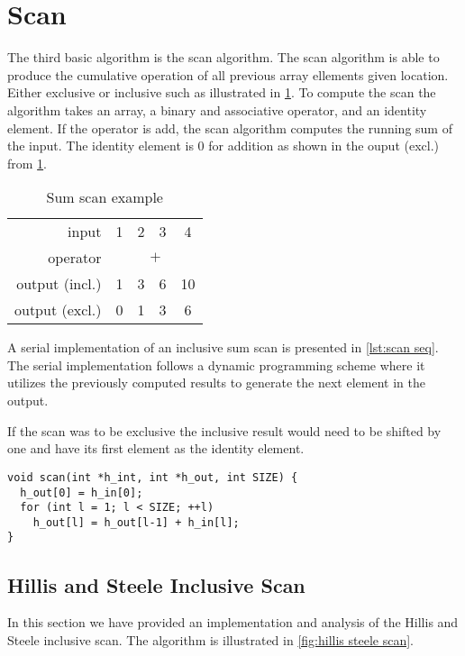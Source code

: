 \section{Scan}
\label{sec:scan}

The third basic algorithm is the scan algorithm.
The scan algorithm is able to produce the cumulative operation of all previous array ellements given location.
Either exclusive or inclusive such as illustrated in \cref{tab:scan example}.
To compute the scan the algorithm takes an array, a binary and associative operator, and an identity element.
If the operator is add, the scan algorithm computes the running sum of the input.
The identity element is 0 for addition as shown in the ouput (excl.) from \cref{tab:scan example}.

\begin{table}[htb]
  \centering
  \begin{tabular}{r | c c c c}
    \toprule
    input & 1 & 2 & 3 & 4 \\
    operator & \multicolumn{4}{c}{$\mathtt{+}$} \\
    output (incl.) & 1 & 3 & 6 & 10 \\
    output (excl.) & 0 & 1 & 3 & 6 \\
    \bottomrule
  \end{tabular}
  \caption{Sum scan example}
  \label{tab:scan example}
\end{table}
    
A serial implementation of an inclusive sum scan is presented in \cref{lst:scan seq}.
The serial implementation follows a dynamic programming scheme where it utilizes the previously computed results to generate the next element in the output.

If the scan was to be exclusive the inclusive result would need to be shifted by one and have its first element as the identity element.
\begin{lstlisting}[caption={Serial scan}, label={lst:scan seq}]
void scan(int *h_int, int *h_out, int SIZE) {
  h_out[0] = h_in[0];
  for (int l = 1; l < SIZE; ++l)
    h_out[l] = h_out[l-1] + h_in[l];
}
\end{lstlisting}

\subsection{Hillis and Steele Inclusive Scan}
\label{sec:hillis and steele scan}

In this section we have provided an implementation and analysis of the Hillis and Steele inclusive scan.
The algorithm is illustrated in \cref{fig:hillis steele scan}.

